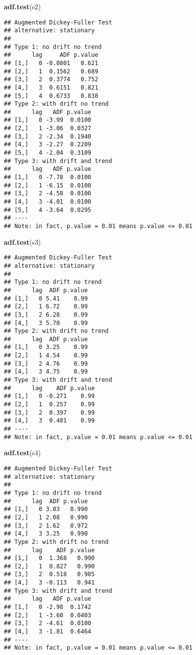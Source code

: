 \documentclass[
]{book}
\newenvironment{Shaded}{\begin{snugshade}}{\end{snugshade}}
\newcommand{\FunctionTok}[1]{\textcolor[rgb]{0.13,0.29,0.53}{\textbf{#1}}}
\newcommand{\NormalTok}[1]{#1}
\theoremstyle{definition}
\theoremstyle{definition}
\theoremstyle{definition}
\theoremstyle{definition}
\theoremstyle{remark}
\begin{document}
\begin{Shaded}
\begin{Highlighting}[]
\FunctionTok{adf.test}\NormalTok{(s2)}
\end{Highlighting}
\end{Shaded}

\begin{verbatim}
## Augmented Dickey-Fuller Test 
## alternative: stationary 
##  
## Type 1: no drift no trend 
##      lag     ADF p.value
## [1,]   0 -0.0801   0.621
## [2,]   1  0.1562   0.689
## [3,]   2  0.3774   0.752
## [4,]   3  0.6151   0.821
## [5,]   4  0.6733   0.838
## Type 2: with drift no trend 
##      lag   ADF p.value
## [1,]   0 -3.99  0.0100
## [2,]   1 -3.06  0.0327
## [3,]   2 -2.34  0.1940
## [4,]   3 -2.27  0.2209
## [5,]   4 -2.04  0.3109
## Type 3: with drift and trend 
##      lag   ADF p.value
## [1,]   0 -7.78  0.0100
## [2,]   1 -6.15  0.0100
## [3,]   2 -4.58  0.0100
## [4,]   3 -4.01  0.0100
## [5,]   4 -3.64  0.0295
## ---- 
## Note: in fact, p.value = 0.01 means p.value <= 0.01
\end{verbatim}

\begin{Shaded}
\begin{Highlighting}[]
\FunctionTok{adf.test}\NormalTok{(s3)}
\end{Highlighting}
\end{Shaded}

\begin{verbatim}
## Augmented Dickey-Fuller Test 
## alternative: stationary 
##  
## Type 1: no drift no trend 
##      lag  ADF p.value
## [1,]   0 5.41    0.99
## [2,]   1 6.72    0.99
## [3,]   2 6.28    0.99
## [4,]   3 5.70    0.99
## Type 2: with drift no trend 
##      lag  ADF p.value
## [1,]   0 3.25    0.99
## [2,]   1 4.54    0.99
## [3,]   2 4.76    0.99
## [4,]   3 4.75    0.99
## Type 3: with drift and trend 
##      lag    ADF p.value
## [1,]   0 -0.271    0.99
## [2,]   1  0.257    0.99
## [3,]   2  0.397    0.99
## [4,]   3  0.481    0.99
## ---- 
## Note: in fact, p.value = 0.01 means p.value <= 0.01
\end{verbatim}

\begin{Shaded}
\begin{Highlighting}[]
\FunctionTok{adf.test}\NormalTok{(s4)}
\end{Highlighting}
\end{Shaded}

\begin{verbatim}
## Augmented Dickey-Fuller Test 
## alternative: stationary 
##  
## Type 1: no drift no trend 
##      lag  ADF p.value
## [1,]   0 3.03   0.990
## [2,]   1 2.08   0.990
## [3,]   2 1.62   0.972
## [4,]   3 3.25   0.990
## Type 2: with drift no trend 
##      lag    ADF p.value
## [1,]   0  1.368   0.990
## [2,]   1  0.827   0.990
## [3,]   2  0.518   0.985
## [4,]   3 -0.113   0.941
## Type 3: with drift and trend 
##      lag   ADF p.value
## [1,]   0 -2.98  0.1742
## [2,]   1 -3.60  0.0403
## [3,]   2 -4.61  0.0100
## [4,]   3 -1.81  0.6464
## ---- 
## Note: in fact, p.value = 0.01 means p.value <= 0.01
\end{verbatim}
\end{document}
